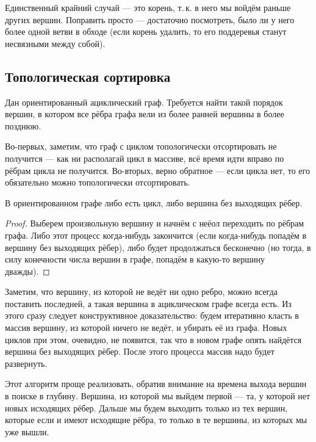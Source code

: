 Единственный крайний случай --- это корень, т.\,к. в него мы войдём раньше других вершин. Поправить просто --- достаточно посмотреть, было ли у него более одной ветви в обходе (если корень удалить, то его поддеревья станут несвязными между собой).

\subsection{Топологическая сортировка}

\begin{problem}
    Дан ориентированный ациклический граф. Требуется найти такой порядок вершин, в котором все рёбра графа вели из более ранней вершины в более позднюю.
\end{problem}

Во-первых, заметим, что граф с циклом топологически отсортировать не получится --- как ни располагай цикл в массиве, всё время идти вправо по рёбрам цикла не получится. Во-вторых, верно обратное --- если цикла нет, то его обязательно можно топологически отсортировать.

\begin{lemma}
    В ориентированном графе либо есть цикл, либо вершина без выходящих рёбер.
\end{lemma}

\begin{proof}
    Выберем произвольную вершину и начнём с неёол переходить по рёбрам графа. Либо этот процесс когда-нибудь закончится (если когда-нибудь попадём в вершину без выходящих рёбер), либо будет продолжаться бесконечно (но тогда, в силу конечности числа вершин в графе, попадём в какую-то вершину дважды).
\end{proof}

Заметим, что вершину, из которой не ведёт ни одно ребро, можно всегда поставить последней, а такая вершина в ациклическом графе всегда есть. Из этого сразу следует конструктивное доказательство: будем итеративно класть в массив вершину, из которой ничего не ведёт, и убирать её из графа. Новых циклов при этом, очевидно, не появится, так что в новом графе опять найдётся вершина без выходящих рёбер. После этого процесса массив надо будет развернуть.

Этот алгоритм проще реализовать, обратив внимание на времена выхода вершин в поиске в глубину. Вершина, из которой мы выйдем первой --- та, у которой нет новых исходящих рёбер. Дальше мы будем выходить только из тех вершин, которые если и имеют исходящие рёбра, то только в те вершины, из которых мы уже вышли.

